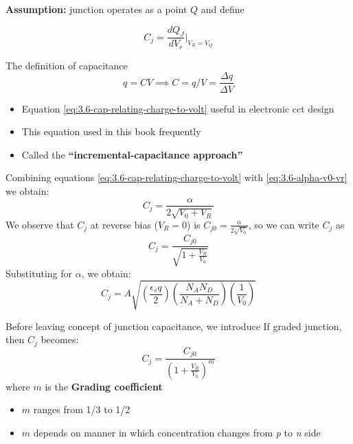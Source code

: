 \documentclass{report}
\begin{document}
\textbf{Assumption:} junction operates as a point $Q$ and define

\begin{equation}
	C_j = \frac{dQ_J}{dV_r} \bigg| _{V_R=V_Q}
	\label{eq:3.6-cap-relating-charge-to-volt}
\end{equation}
\begin{note}
	The definition of capacitance
	\begin{equation*}
		q = CV
		\implies C = q/V = \frac{\Delta q}{\Delta V}
	\end{equation*}
	\begin{itemize}
		\item Equation \ref{eq:3.6-cap-relating-charge-to-volt} useful in electronic cct design
		\item This equation used in this book frequently
		\item Called the \textbf{``incremental-capacitance approach''}
	\end{itemize}
\end{note}

Combining equations \ref{eq:3.6-cap-relating-charge-to-volt} with \ref{eq:3.6-alpha-v0-vr} we obtain:
\begin{equation}
	C_j = \frac{\alpha}{2\sqrt{V_0 + V_R}}
	\label{eq:3.6-derivative-Cj}
\end{equation}
We observe that $C_j$ at reverse bias ($V_R = 0$) is $C_{j0} = \frac{\alpha}{2\sqrt{V_0}}$, so we can write $C_j$ as
\begin{equation}
	C_j = \frac{C_{j0}}{\sqrt{1+\frac{V_R}{V_0}}}
	\label{eq:3.6-cj-wrt-cj0}
\end{equation}
Substituting for $\alpha$, we obtain:
\begin{equation}
	C_j = A \sqrt{\left(
		\frac{\epsilon_s q}{2}
	\right)\left(
		\frac{N_A N_D}{N_A + N_D}
	\right)\left(
		\frac{1}{V_0}
	\right)}
	\label{eq:3.6-cj-wrt-cj0-alpha-sub}
\end{equation}

Before leaving concept of junction capacitance, we introduce
If graded junction, then $C_j$ becomes:
\begin{equation*}
	C_j = \frac{C_{j0}}{\left(1+\frac{V_R}{V_0}\right)^m}
\end{equation*}
where $m$ is the \textbf{Grading coefficient}
\begin{itemize}
	\item $m$ ranges from 1/3 to 1/2
	\item $m$ depends on manner in which concentration changes from \textit{p} to \textit{n} side
\end{itemize}
\end{document}
